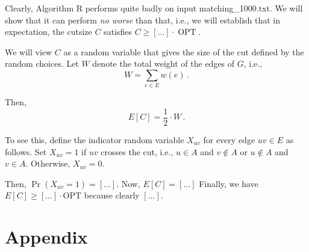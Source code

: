 \documentclass{tufte-handout}
\begin{document}
Clearly, Algorithm R performs quite badly on input 
  matching\_1000.txt.
We will show that it can perform \emph{no worse} than that, i.e., we
will establish that in expectation, the cutsize $C$ satisfies $C \geq
[\ldots]\cdot \operatorname{OPT}$.\


We will view $C$ as a random variable that gives the size of the cut
defined by the random choices.
Let $W$ denote the total weight of the edges of $G$, i.e.,
\[ W= \sum_{e\in E} w(e)\,.\]

Then,
\begin{equation}\label{eq: E[C]}
E[C] = \textstyle\frac{1}{2}\cdot W\,.
\end{equation}

To see this, define the indicator random variable $X_{uv}$ for every
edge $uv\in E$ as follows.
Set $X_{uv}=1$ if $uv$ crosses the cut, i.e., $u\in A$ and $v\notin A$
or $u\notin A$ and $v\in A$.
Otherwise, $X_{uv} = 0$.

Then, $\Pr(X_{uv} = 1) = [\ldots]$.
Now, $E[C]=[\ldots]$ Finally, we have 
\(E[C]\geq [\ldots]\cdot \text{OPT}\) because clearly
$[\ldots]$.


\newpage
\section*{Appendix}
\appendix

\end{document}
